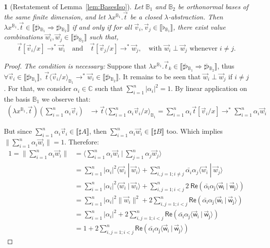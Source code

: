\documentclass[a4paper,UKenglish,numberwithinsect,pdfa,anonymous]{lipics-v2021}
\theoremstyle{restatestyle}
\newtheorem*{restatelemma}{}
\newcommand\Rpart[1]{\mathsf{Re(#1)}}
\newcommand\lra{\longrightarrow}
\newcommand\ansubst[2]{\ensuremath{\langle #1 \rangle_{#2}}}
\def\C{\mathbb{C}}            %
\def\scal#1#2{\langle{#1}~|~{#2}\rangle}
\def\Lam#1#2#3{\lambda#1^{#2}{.}#3} %
\def\eval{\lra^*}
\def\BB{\mathbb{B}}
\def\Arr{\Rightarrow}
\def\sem#1{\llbracket#1\rrbracket}
\newcommand\basis[1]{\ensuremath{\flat_{#1}}}
\begin{document}
\begin{restatelemma}[Restatement of Lemma~\ref{lem:BasesIso}]
  Let $\BB_1$ and $\BB_2$ be orthonormal bases of the same finite
  dimension, and let $\Lam{x}{\BB_1}{\vec t}$ be a closed $\lambda$-abstraction.
  Then $\Lam{x}{{\BB_1}}{\vec t}\in\sem{\sharp\basis{\BB_1}\Arr\sharp\basis{\BB_2}}$
  if and only if 
  for all $\vec{v}_{i},\vec{v}_{j}\in\sem{\basis{\BB_1}}$,
  there exist value combinations
  $\vec{w}_{i},\vec{w}_{j}\in\sem{\sharp\basis{\BB_2}}$ such that,
  \[
    \vec{t}[\vec{v}_{i}/x]\eval\vec{w}_{i}
    \quad\text{and}\quad
    \vec{t}[\vec{v}_{j}/x]\eval\vec{w}_{j},
    \quad\text{with } 
    \vec{w}_{i}\perp\vec{w}_{j}\text{ whenever }i\neq j.
  \]
\end{restatelemma}
\begin{proof}
  \textit{The condition is necessary:} Suppose that $\Lam{x}{{\BB_1}}{\vec{t}_{k}}\in\sem{\sharp\basis{\BB_1}\Arr\sharp\basis{\BB_2}}$, thus $\forall \vec{v}_{i}\in\sem{\sharp\basis{\BB_1}},\ \vec{t}\ansubst{\vec{v}_{i}/x}{\BB_1}\eval\vec{w}_{i}\in\sem{\sharp\basis{\BB_2}}$. It remains to be seen that $\vec{w}_{i} \perp \vec{w}_{j}$ if $i\neq j$. For that, we consider $\alpha_i\in\C$ such that $\sum_{i=1}^n |\alpha_i|^2 = 1$. By linear application on the basis $\BB_1$ we observe that:
  \begin{align*}
    (\Lam{x}{{\BB_1}}{\vec{t}})(\sum_{i=1}^n \alpha_i \vec{v}_{i}) &\lra \vec t\ansubst{\sum_{i=1}^n \alpha_i \vec{v}_{i}/x}{\BB_1}
    = \sum_{i=1}^{n} \alpha_i \vec{t}[\vec{v}_{i}/x] 
    \eval \sum_{i=1}^n \alpha_i \vec{w}_{i}
  \end{align*}

  But since $\sum_{i=1}^n \alpha_i \vec{v}_{i}\in\sem{\sharp A}$, then $\sum_{i=1}^n \alpha_i \vec{w}_{i}\in\sem{\sharp B}$ too. Which implies $\|\sum_{i=1}^n \alpha_i \vec{w}_{i}\|=1$. Therefore:
  \begin{align*}
    1 = \|\sum_{i=1}^n \alpha_i \vec{w}_{i}\| &= \scal{\sum_{i=1}^n \alpha_i \vec{w}_{i}}{\sum_{j=1}^n \alpha_j \vec{w}_{j}}\\
    &=\sum_{i=1}^n |\alpha_i|^2 \scal{\vec{w}_{i}}{\vec{w}_{i} } + \sum_{i,j=1; i\neq j}^n \bar{\alpha_i}\alpha_j \scal{\vec{w}_{i}}{\vec{w}_{j}}\\
    &=\sum_{i=1}^n |\alpha_i|^2 \scal{\vec{w}_{i}}{\vec{w}_{i} } + \sum_{i,j=1; i<j}^n 2~\Rpart{\bar{\alpha_i}\alpha_j \scal{\vec{w}_{i}}{\vec{w}_{j}}}\\
    &=\sum_{i=1}^n |\alpha_i|^2 \|\vec{w}_{i}\|^2 + 2\sum_{i,j=1; i<j}^n \Rpart{\bar{\alpha_i}\alpha_j \scal{\vec{w}_{i}}{\vec{w}_{j}}}\\
    &=\sum_{i=1}^n |\alpha_i|^2 + 2\sum_{i,j=1; i<j}^n\Rpart{\bar{\alpha_i}\alpha_j \scal{\vec{w}_{i}}{\vec{w}_{j}}}\\
    &= 1 + 2\sum_{i,j=1; i<j}^n \Rpart{\bar{\alpha_i}\alpha_j \scal{\vec{w}_{i}}{\vec{w}_{j}}}
  \end{align*}


\end{proof}
\end{document}
